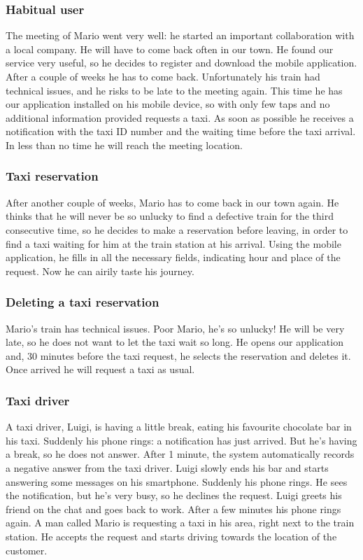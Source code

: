 		\subsubsection{Habitual user}
			The meeting of Mario went very well: he started an important collaboration with a local
			company. He will have to come back often in our town. He found our service very useful, so
			he decides to register and download the mobile application. After a couple of weeks he has to
			come back. Unfortunately his train had technical issues, and he risks to be late to the
			meeting again. This time he has our application installed on his mobile device, so with only
			few taps and no additional information provided requests a taxi. As soon as possible he receives
			a notification with the taxi ID number and the	waiting time before the taxi arrival.
			In less than no time he will reach the meeting location.
		\subsubsection{Taxi reservation}
			After another couple of weeks, Mario has to come back in our town again. He thinks that he 
			will never be so unlucky to find a defective train for the third consecutive time,
			so he decides to make a reservation before leaving,	in order to find a taxi waiting for him
			at the train station at his arrival. Using the mobile application, he fills in all the
			necessary fields, indicating hour and place of the request.
			Now he can airily taste	his journey.
		\subsubsection{Deleting a taxi reservation}
			Mario's train has technical issues. Poor Mario, he's so unlucky! He will be very late, 
			so he does not want to let the taxi wait so long. He opens our application and, 30 minutes
			before the taxi request, he selects the reservation and deletes it. Once arrived he will
			request a taxi as usual.
		\subsubsection{Taxi driver}
			A taxi driver, Luigi, is having a little break, eating his favourite chocolate bar in his taxi. Suddenly
			his phone rings: a notification has just arrived. But he's having a break, so he does not answer.
			After 1 minute, the system automatically records a negative answer from the taxi driver.
			Luigi slowly ends his bar and starts answering some messages on his smartphone. Suddenly his phone
			rings. He sees the notification, but he's very busy, so he declines the request. Luigi greets his
			friend on the chat and goes back to work. After a few minutes his phone rings again. A man called
			Mario is requesting a taxi in his area, right next to the train station. He accepts the request and
			starts driving towards the location of the customer.
